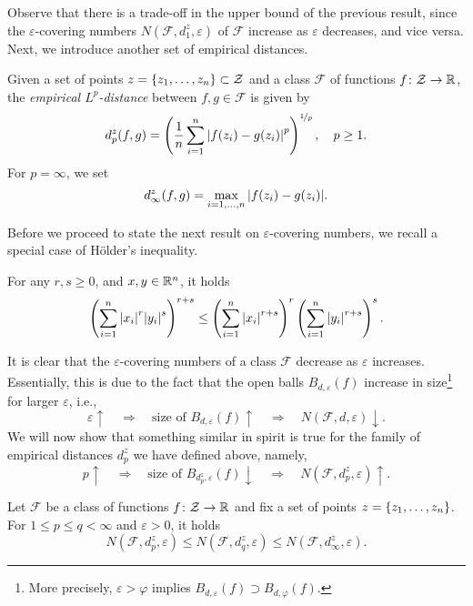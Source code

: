 Observe that there is a trade-off in the upper bound of the previous result, since the $\varepsilon$-covering numbers $N(\mathcal{F}, d_1^z, \varepsilon)$ of $\mathcal{F}$ increase as $\varepsilon$ decreases, and vice versa. Next, we introduce another set of empirical distances.

\begin{definition}
Given a set of points $z = \left\{z_1, \dots, z_n\right\} \subset \mathcal{Z}$ and a class $\mathcal{F}$ of functions $f \colon \mathcal{Z} \to \mathbb{R}$, the \emph{empirical $L^p$-distance} between $f, g \in \mathcal{F}$ is given by
\[
    d_p^z(f, g) = \left( \frac{1}{n} \sum_{i=1}^n \abs{f(z_i) - g(z_i)}^p \right)^{\nicefrac{1}{p}}, \quad p \geq 1.
\]
For $p = \infty$, we set
\[
    d_{\infty}^z(f, g) = \max_{i = 1, \dots, n} \abs{f(z_i) - g(z_i)}.
\]
\end{definition}

Before we proceed to state the next result on $\varepsilon$-covering numbers, we recall a special case of H{\"o}lder's inequality.

\begin{proposition}[H{\"o}lder, 1889]
\label{prop: hoelder}
For any $r, s \geq 0$, and $x, y \in \mathbb{R}^n$, it holds
\[
    \left( \sum_{i=1}^n \abs{x_i}^r \abs{y_i}^s \right)^{r+s} \leq \left( \sum_{i=1}^n \abs{x_i}^{r+s} \right)^r \left( \sum_{i=1}^n \abs{y_i}^{r+s} \right)^s.
\]
\end{proposition}

It is clear that the $\varepsilon$-covering numbers of a class $\mathcal{F}$ decrease as $\varepsilon$ increases. Essentially, this is due to the fact that the open balls $B_{d, \varepsilon}(f)$ increase in size\footnote{More precisely, $\varepsilon > \varphi$ implies $B_{d, \varepsilon}(f) \supset B_{d, \varphi}(f)$.} for larger $\varepsilon$, i.e.,
\[
    \varepsilon \uparrow \quad \Rightarrow \quad \text{size of } B_{d, \varepsilon}(f) \uparrow \quad \Rightarrow \quad N(\mathcal{F}, d, \varepsilon) \downarrow.
\]
We will now show that something similar in spirit is true for the family of empirical distances $d_p^z$ we have defined above, namely,
\[
    p \uparrow \quad \Rightarrow \quad \text{size of } B_{d_p^z, \varepsilon}(f) \downarrow \quad \Rightarrow \quad N(\mathcal{F}, d_p^z, \varepsilon) \uparrow.
\]

\begin{proposition}
Let $\mathcal{F}$ be a class of functions $f \colon \mathcal{Z} \to \mathbb{R}$ and fix a set of points $z = \left\{z_1, \dots, z_n\right\}$. For $1 \leq p \leq q < \infty$ and $\varepsilon > 0$, it holds
\[
    N(\mathcal{F}, d_p^z, \varepsilon) \leq N(\mathcal{F}, d_q^z, \varepsilon) \leq N(\mathcal{F}, d_{\infty}^z, \varepsilon).
\]
\end{proposition}

